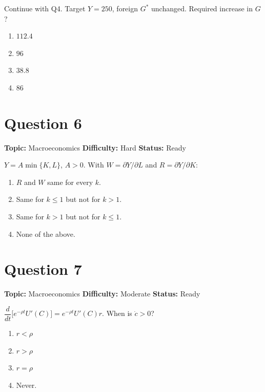\documentclass[11pt]{article}
\begin{document}
Continue with Q4. Target $Y = 250$, foreign $G^*$ unchanged. Required increase in $G$?
\begin{enumerate}[label=(\Alph*)]
\item $112.4$ \quad \item $96$ \quad \item $38.8$ \quad \item $86$
\end{enumerate}

\newpage

\section*{Question 6}


\noindent\textbf{Topic:} Macroeconomics \quad \textbf{Difficulty:} Hard \quad \textbf{Status:} Ready



$Y = A\min\{K,L\}$, $A > 0$. With $W=\partial Y/\partial L$ and $R = \partial Y/\partial K$:
\begin{enumerate}[label=(\Alph*)]
\item $R$ and $W$ same for every $k$.
\item Same for $k\le 1$ but not for $k>1$.
\item Same for $k>1$ but not for $k\le 1$.
\item None of the above.
\end{enumerate}

\newpage

\section*{Question 7}


\noindent\textbf{Topic:} Macroeconomics \quad \textbf{Difficulty:} Moderate \quad \textbf{Status:} Ready



$\dfrac{d}{dt}\bigl[e^{-\rho t}U'(C)\bigr] = e^{-\rho t}U'(C) r$. When is $\dot c > 0$?
\begin{enumerate}[label=(\Alph*)]
\item $r < \rho$ \quad \item $r > \rho$ \quad \item $r = \rho$ \quad \item Never.
\end{enumerate}
\end{document}
